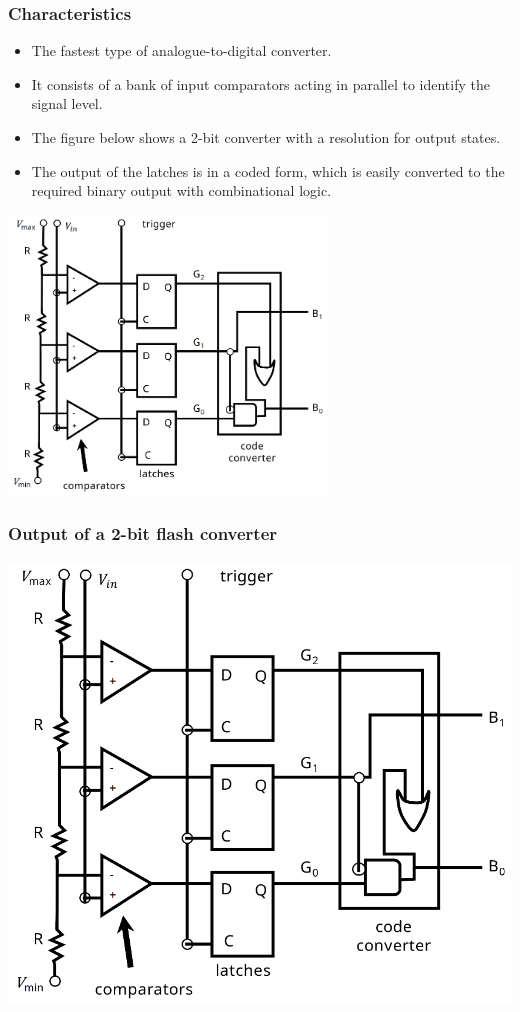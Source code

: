 \documentclass[11pt]{article}
\begin{document}
\subsubsection{Characteristics}
\label{sec:orgaa5cb5c}
\begin{itemize}
\item The fastest type of analogue-to-digital converter.
\item It consists of a bank of input comparators acting in parallel to identify the signal level.
\item The figure below shows a 2-bit converter with a resolution for output states.
\item The output of the latches is in a coded form, which is easily converted to the required binary output with combinational logic.
\end{itemize}

\begin{center}
\includegraphics[height=20em]{./images/2-bit-flash-converter-diagram.png}
\end{center}
\subsubsection{Output of a 2-bit flash converter}
\label{sec:org510e61d}
\begin{center}
\includegraphics[width=.9\linewidth]{./images/2-bit-flash-converter-diagram.png}
\end{center}
\end{document}

